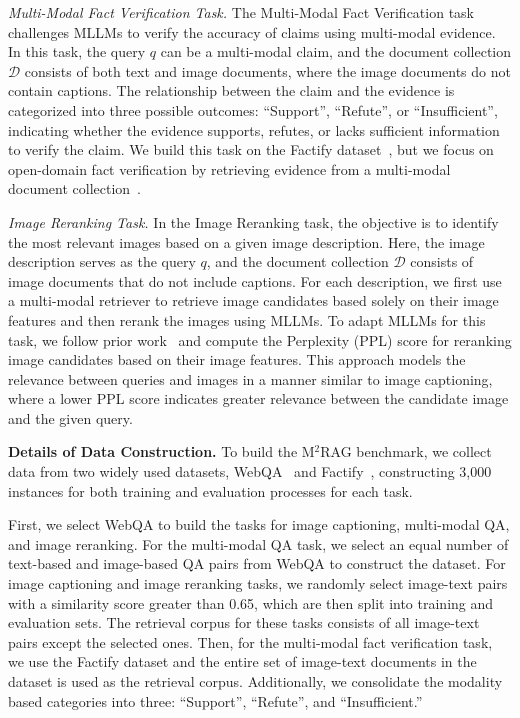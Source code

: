 \textit{Multi-Modal Fact Verification Task.} The Multi-Modal Fact Verification task challenges MLLMs to verify the accuracy of claims using multi-modal evidence. In this task, the query $q$ can be a multi-modal claim, and the document collection $\mathcal{D}$ consists of both text and image documents, where the image documents do not contain captions. The relationship between the claim and the evidence is categorized into three possible outcomes: ``Support'', ``Refute'', or ``Insufficient'', indicating whether the evidence supports, refutes, or lacks sufficient information to verify the claim. We build this task on the Factify dataset~\cite{mishra2022factify}, but we focus on open-domain fact verification by retrieving evidence from a multi-modal document collection~\cite{thorne2018fever}.



\textit{Image Reranking Task.} In the Image Reranking task, the objective is to identify the most relevant images based on a given image description. Here, the image description serves as the query $q$, and the document collection $\mathcal{D}$ consists of image documents that do not include captions. For each description, we first use a multi-modal retriever to retrieve image candidates based solely on their image features and then rerank the images using MLLMs. To adapt MLLMs for this task, we follow prior work~\cite{muennighoff2022sgpt} and compute the Perplexity (PPL) score for reranking image candidates based on their image features. This approach models the relevance between queries and images in a manner similar to image captioning, where a lower PPL score indicates greater relevance between the candidate image and the given query.

% 
\textbf{Details of Data Construction.} To build the M$^2$RAG benchmark, we collect data from two widely used datasets, WebQA~\cite{chang2022webqa} and Factify~\cite{mishra2022factify}, constructing 3,000 instances for both training and evaluation processes for each task.

First, we select WebQA to build the tasks for image captioning, multi-modal QA, and image reranking. For the multi-modal QA task, we select an equal number of text-based and image-based QA pairs from WebQA to construct the dataset. For image captioning and image reranking tasks, we randomly select image-text pairs with a similarity score greater than 0.65, which are then split into training and evaluation sets. The retrieval corpus for these tasks consists of all image-text pairs except the selected ones. Then, for the multi-modal fact verification task, we use the Factify dataset and the entire set of image-text documents in the dataset is used as the retrieval corpus. Additionally, we consolidate the modality based categories into three: ``Support'', ``Refute'', and ``Insufficient.''

